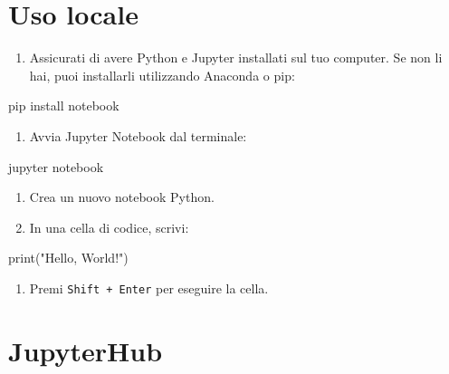 \documentclass[
  letterpaper,
  DIV=11,
  numbers=noendperiod]{scrreprt}
\newenvironment{Shaded}{\begin{snugshade}}{\end{snugshade}}
\newcommand{\BuiltInTok}[1]{\textcolor[rgb]{0.00,0.23,0.31}{#1}}
\newcommand{\ExtensionTok}[1]{\textcolor[rgb]{0.00,0.23,0.31}{#1}}
\newcommand{\NormalTok}[1]{\textcolor[rgb]{0.00,0.23,0.31}{#1}}
\newcommand{\StringTok}[1]{\textcolor[rgb]{0.13,0.47,0.30}{#1}}
\providecommand{\tightlist}{%
  \setlength{\itemsep}{0pt}\setlength{\parskip}{0pt}}\usepackage{longtable,booktabs,array}
\begin{document}
\section{Uso locale}

\begin{enumerate}
\def\labelenumi{\arabic{enumi}.}
\tightlist
\item
  Assicurati di avere Python e Jupyter installati sul tuo computer. Se
  non li hai, puoi installarli utilizzando Anaconda o pip:
\end{enumerate}

\begin{Shaded}
\begin{Highlighting}[]
\ExtensionTok{pip}\NormalTok{ install notebook}
\end{Highlighting}
\end{Shaded}

\begin{enumerate}
\def\labelenumi{\arabic{enumi}.}
\setcounter{enumi}{1}
\tightlist
\item
  Avvia Jupyter Notebook dal terminale:
\end{enumerate}

\begin{Shaded}
\begin{Highlighting}[]
\ExtensionTok{jupyter}\NormalTok{ notebook}
\end{Highlighting}
\end{Shaded}

\begin{enumerate}
\def\labelenumi{\arabic{enumi}.}
\setcounter{enumi}{2}
\tightlist
\item
  Crea un nuovo notebook Python.
\item
  In una cella di codice, scrivi:
\end{enumerate}

\begin{Shaded}
\begin{Highlighting}[]
\BuiltInTok{print}\NormalTok{(}\StringTok{"Hello, World!"}\NormalTok{)}
\end{Highlighting}
\end{Shaded}

\begin{enumerate}
\def\labelenumi{\arabic{enumi}.}
\setcounter{enumi}{4}
\tightlist
\item
  Premi \texttt{Shift\ +\ Enter} per eseguire la cella.
\end{enumerate}

\section{JupyterHub}
\end{document}
